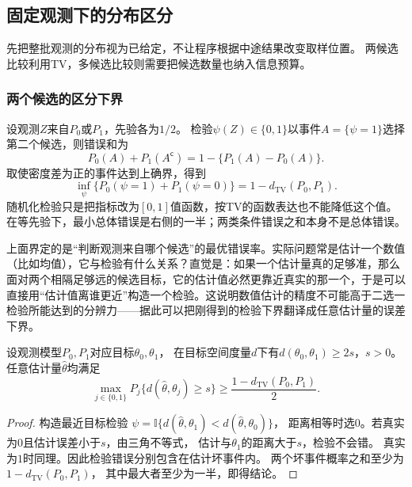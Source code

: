 \subsection{固定观测下的分布区分}
\label{sec:information-fixed-observations}

先把整批观测的分布视为已给定，不让程序根据中途结果改变取样位置。
两候选比较利用TV，多候选比较则需要把候选数量也纳入信息预算。

\subsubsection{两个候选的区分下界}
\label{sec:information-two-candidates}

设观测\(Z\)来自\(P_0\)或\(P_1\)，先验各为\(1/2\)。
检验\(\psi(Z)\in\{0,1\}\)以事件\(A=\{\psi=1\}\)选择第二个候选，则错误和为
\[
  P_0(A)+P_1(A^{\mathsf c})=1-\{P_1(A)-P_0(A)\}.
\]
取使密度差为正的事件达到上确界，得到
\begin{equation}
  \inf_\psi\{P_0(\psi=1)+P_1(\psi=0)\}
     =1-d_{\mathrm{TV}}(P_0,P_1).
  \label{eq:information-binary-testing-tv}
\end{equation}
随机化检验只是把指标改为\([0,1]\)值函数，按TV的函数表达也不能降低这个值。
在等先验下，最小总体错误是右侧的一半；两类条件错误之和本身不是总体错误。

上面界定的是“判断观测来自哪个候选”的最优错误率。实际问题常是估计一个数值（比如均值），它与检验有什么关系？直觉是：如果一个估计量真的足够准，那么面对两个相隔足够远的候选目标，它的估计值必然更靠近真实的那一个，于是可以直接用“估计值离谁更近”构造一个检验。这说明数值估计的精度不可能高于二选一检验所能达到的分辨力——据此可以把刚得到的检验下界翻译成任意估计量的误差下界。

\begin{theorem}[Le Cam两点下界]
\label{thm:information-le-cam}
设观测模型\(P_0,P_1\)对应目标\(\theta_0,\theta_1\)，
在目标空间度量\(d\)下有\(d(\theta_0,\theta_1)\geq2s\)，\(s>0\)。
任意估计量\(\widehat\theta\)均满足
\begin{equation}
  \max_{j\in\{0,1\}}P_j\{d(\widehat\theta,\theta_j)\geq s\}
  \geq\frac{1-d_{\mathrm{TV}}(P_0,P_1)}2.
  \label{eq:information-le-cam}
\end{equation}
\end{theorem}
\begin{proof}
构造最近目标检验
\(\psi=\mathbb I\{d(\widehat\theta,\theta_1)<d(\widehat\theta,\theta_0)\}\)，
距离相等时选\(0\)。若真实为\(0\)且估计误差小于\(s\)，由三角不等式，
估计与\(\theta_1\)的距离大于\(s\)，检验不会错。
真实为\(1\)时同理。因此检验错误分别包含在估计坏事件内。
两个坏事件概率之和至少为\(1-d_{\mathrm{TV}}(P_0,P_1)\)，
其中最大者至少为一半，即得结论。
\end{proof}

